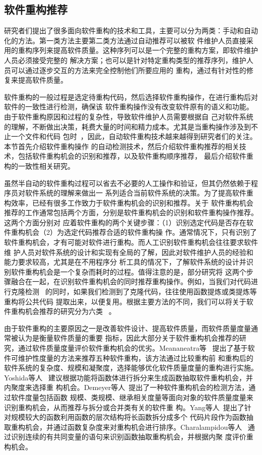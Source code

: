 \subsection{软件重构推荐}

研究者们提出了很多面向软件重构的技术和工具，主要可以分为两类：手动和自动化的方法。第一类方法主要第二类方法通过自动推荐可以被软
件维护人员直接采用的重构序列来提高软件质量\cite{harman2007pareto, kessentini2011design,
ouni2013maintainability, Silva2014}。这种序列可以是一个完整的重构方案，即软件维护人员必须接受完整的
解决方案；也可以是针对特定重构类型的推荐序列，维护人员可以通过逐步交互的方法来完全控制他们所要应用的
重构，通过有针对性的修复来提高软件质量。

软件重构的一般过程是选定待重构代码，然后选择软件重构操作，在进行重构后对软件的一致性进行检测，确保该
软件重构操作没有改变软件原有的语义和功能。由于软件重构原因和过程的复杂性，导致软件维护人员需要根据自
己对软件系统的理解，不断做出决策，耗费大量的时间和精力成本。尤其是当重构操作涉及到不止一个文件和代码
包时~\cite{liu2013monitor}，因此，自动软件重构技术越来越得到研究者们的关注。本节首先介绍软件重构操作
的自动检测技术，然后介绍软件重构推荐的相关技术，包括软件重构机会的识别和推荐，以及软件重构顺序推荐，
最后介绍软件重构的一致性相关研究。


虽然半自动的软件重构过程可以省去不必要的人工操作和验证，但其仍然依赖于程序员对软件系统的理解来做出一
系列适合当前软件系统的决策。为了提高软件重构效率，已经有很多工作致力于软件重构机会的识别和推荐。关于
软件重构机会推荐的工作通常包括两个方面，分别是软件重构机会的识别和软件重构操作推荐。这两个方面分别对
应着软件重构的两个关键步骤：（1）识别选定代码是否存在软件重构机会（2）为选定代码推荐合适的软件重构操
作。通常情况下，只有识别了软件重构机会，才有可能对软件进行重构。而人工识别软件重构机会往往要求软件维
护人员对软件系统的设计和实现有全局的了解，因此对软件维护人员的经验和能力要求较高，尤其是在不用程序分
析工具的情况下，了解软件系统的设计并识别软件重构机会是一个复杂而耗时的过程。值得注意的是，部分研究将
这两个步骤融合在一起，在识别软件重构机会的同时推荐重构操作。例如，当我们对代码进行克隆检测
~\cite{kamiya2002ccfinder}的同时，如果我们检测到了克隆代码，往往使用函数提炼或类提炼等重构将公共代码
提取出来，以便复用。根据主要方法的不同，我们可以将关于软件重构机会推荐的研究分为六类
~\cite{al2015identifying}。

由于软件重构的主要原因之一是改善软件设计、提高软件质量，而软件质量度量通常被认为是衡量软件质量的重要
指标，因此大部分关于软件重构机会推荐的研究，通过软件质量度量评价软件重构机会的优劣。Meananeatra等
~\cite{meananeatra2011using}提出了基于软件可维护性度量的方法来推荐五种软件重构，该方法通过比较重构前
和重构后的软件系统的复杂度、规模和凝聚度，选择能够优化软件质量度量的重构进行实施。Yoshida等人
~\cite{yoshida2012cohesion}建议根据功能将函数体进行拆分来生成函数抽取软件重构机会，并内聚度来选择重
构机会。Demeyer等人~\cite{demeyer2000finding}提出了一种软件重构机会的检测方法，通过软件度量包括函数
规模、类规模、继承相关度量等面向对象的软件质量度量来识别重构机会，从而推荐与拆分或合并类有关的软件重
构。Yang等人~\cite{yang2009identifying}提出了针对规模较大的函数利用函数的层次结构将长函数拆分成多个
代码片段作为函数抽取重构机会，并通过函数复杂度来对重构机会进行排序。Charalampidou等人
~\cite{charalampidou2016identifying}通过识别连续的有共同变量的语句来识别函数抽取重构机会，并根据内聚
度评价重构机会。

